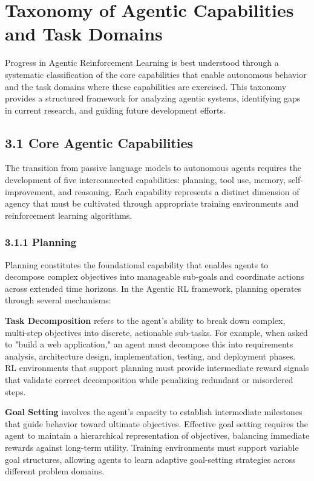 \section{ Taxonomy of Agentic Capabilities and Task Domains}

Progress in Agentic Reinforcement Learning is best understood through a systematic classification of the core capabilities that enable autonomous behavior and the task domains where these capabilities are exercised. This taxonomy provides a structured framework for analyzing agentic systems, identifying gaps in current research, and guiding future development efforts.

\subsection{3.1 Core Agentic Capabilities}

The transition from passive language models to autonomous agents requires the development of five interconnected capabilities: planning, tool use, memory, self-improvement, and reasoning. Each capability represents a distinct dimension of agency that must be cultivated through appropriate training environments and reinforcement learning algorithms.

\subsubsection{3.1.1 Planning}

Planning constitutes the foundational capability that enables agents to decompose complex objectives into manageable sub-goals and coordinate actions across extended time horizons. In the Agentic RL framework, planning operates through several mechanisms:

\textbf{Task Decomposition} refers to the agent's ability to break down complex, multi-step objectives into discrete, actionable sub-tasks. For example, when asked to "build a web application," an agent must decompose this into requirements analysis, architecture design, implementation, testing, and deployment phases. RL environments that support planning must provide intermediate reward signals that validate correct decomposition while penalizing redundant or misordered steps.

\textbf{Goal Setting} involves the agent's capacity to establish intermediate milestones that guide behavior toward ultimate objectives. Effective goal setting requires the agent to maintain a hierarchical representation of objectives, balancing immediate rewards against long-term utility. Training environments must support variable goal structures, allowing agents to learn adaptive goal-setting strategies across different problem domains.

